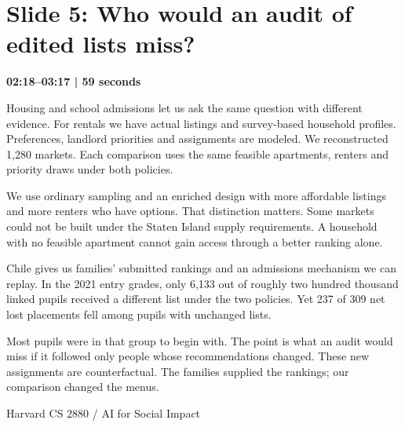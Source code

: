 \documentclass[11pt]{article}
\begin{document}
\section*{Slide 5: Who would an audit of edited lists miss?}
{\color{navy}\textbf{02:18--03:17 | 59 seconds}}\par\medskip
Housing and school admissions let us ask the same question with different evidence. For rentals we have actual listings and survey-based household profiles. Preferences, landlord priorities and assignments are modeled. We reconstructed 1,280 markets. Each comparison uses the same feasible apartments, renters and priority draws under both policies.
\par
We use ordinary sampling and an enriched design with more affordable listings and more renters who have options. That distinction matters. Some markets could not be built under the Staten Island supply requirements. A household with no feasible apartment cannot gain access through a better ranking alone.
\par
Chile gives us families' submitted rankings and an admissions mechanism we can replay. In the 2021 entry grades, only 6,133 out of roughly two hundred thousand linked pupils received a different list under the two policies. Yet 237 of 309 net lost placements fell among pupils with unchanged lists.
\par
Most pupils were in that group to begin with. The point is what an audit would miss if it followed only people whose recommendations changed. These new assignments are counterfactual. The families supplied the rankings; our comparison changed the menus.
\par
\newpage
{\small Harvard CS 2880 / AI for Social Impact}\par
\end{document}
